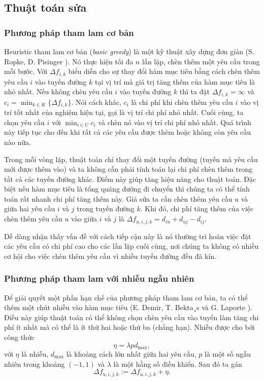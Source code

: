 \subsection{Thuật toán sửa}

\subsubsection{Phương pháp tham lam cơ bản}
\label{sec:basic_greedy}
Heuristic tham lam cơ bản (\textit{basic greedy}) là một kỹ thuật xây dựng đơn giản (S. Ropke, D. Pisinger \cite{ropke2006adaptive}). Nó thực hiện tối đa $n$ lần lặp, chèn thêm một yêu cầu trong mỗi bước. Với $\Delta f_{i, k}$ biểu diễn cho sự thay đổi hàm mục tiêu bằng cách chèn thêm yêu cầu $i$ vào tuyến đường $k$ tại vị trí mà giá trị tăng thêm của hàm mục tiêu là nhỏ nhất. Nếu không chèn yêu cầu $i$ vào tuyến đường $k$ thì ta đặt $\Delta f_{i, k} = \infty$ và $c_i = \min_{k \in K}\{\Delta f_{i, k}\}$. Nói cách khác, $c_i$ là chi phí khi chèn thêm yêu cầu $i$ vào vị trí tốt nhất của nghiệm hiện tại, gọi là vị trí chi phí nhỏ nhất. Cuối cùng, ta chọn yêu cầu $i$ với $\min_{i \in U} c_i$ và chèn nó vào vị trí chi phí nhỏ nhất. Quá trình này tiếp tục cho đến khi tất cả các yêu cầu được thêm hoặc không còn yêu cầu nào nữa.

Trong mỗi vòng lặp, thuật toán chỉ thay đổi một tuyến đường (tuyến mà yêu cầu mới được thêm vào) và ta không cần phải tính toán lại chi phí chèn thêm trong tất cả các tuyến đường khác. Điểm này giúp tăng hiệu năng cho thuật toán. Đặc biệt nếu hàm mục tiêu là tổng quãng đường đi chuyển thì chúng ta có thể tính toán rất nhanh chi phí tăng thêm này. Giả sửa ta cần chèn thêm yêu cầu $u$ và giữa hai yêu cầu $i$ và $j$ trong tuyến đường $k$. Khi đó, chi phí tăng thêm của việc chèn thêm yêu cầu $u$ vào giữa $i$ và $j$ là $\Delta f_{u, i, j, k} = d_{iu} + d_{uj} - d_{ij}$.

Dễ dàng nhận thấy vấn đề với cách tiếp cận này là nó thường trì hoãn việc đặt các yêu cầu có chi phí cao cho các lần lặp cuối cùng, nơi chúng ta không có nhiều cơ hội cho việc chèn thêm yêu cầu vì nhiều tuyến đường đều đã kín. 

\subsubsection{Phương pháp tham lam với nhiễu ngẫu nhiên}

Để giải quyết một phần hạn chế của phương pháp tham lam cơ bản, ta có thể thêm một chút nhiễu vào hàm mục tiêu (E. Demir, T. Bekta¸s và G. Laporte \cite{Demir2012}). Điều này giúp thuật toán có thể không chọn chèn yêu cầu vào tuyến làm tăng chi phí ít nhất mà có thể là ít thứ hai hoặc thứ ba (chẳng hạn). Nhiễu được cho bởi công thức
\begin{equation}
  \eta = \lambda p d_{\text{max}},
\end{equation}
với $\eta$ là nhiễu, $d_{\text{max}}$ là khoảng cách lớn nhất giữa hai yêu cầu, $p$ là một số ngẫu nhiên trong khoảng $(-1,1)$ và $\lambda$ là một hằng số điều khiển. Sau đó ta gán
\begin{equation}
  \Delta f_{u, i, j, k} := \Delta f_{u, i, j, k} + \eta.
\end{equation}

